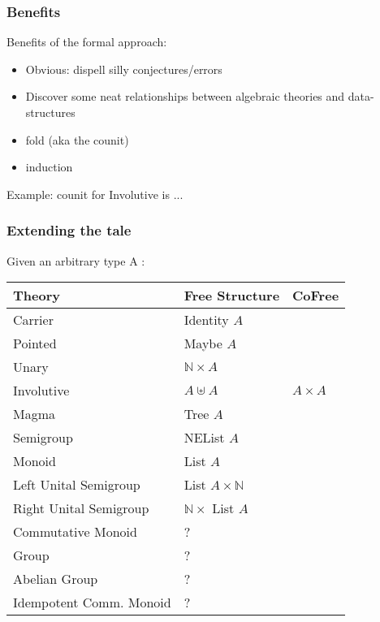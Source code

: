 \documentclass[serif,mathserif,professionalfont,10pt]{beamer}
\newcommand{\sred}[1]{\textcolor{slidered}{#1}}
\begin{document}
\begin{frame}
\frametitle{Benefits}
Benefits of the formal approach:
\begin{itemize}
\item Obvious: dispell silly conjectures/errors
\item Discover some neat relationships between algebraic theories and data-structures
\item fold (aka the counit)
\item induction
\end{itemize} \vspace*{4mm}
\pause
Example: counit for Involutive is ...
\vfill
\end{frame}

\begin{frame}
\frametitle{Extending the tale}
Given an arbitrary type A : \\ \vspace*{4mm}
\begin{tabular}{lll}
\textbf{Theory} & \textbf{Free Structure} & CoFree \\ \hline
Carrier & Identity $A$ & \\
Pointed & Maybe $A$ & \\ \hline
Unary & $ℕ × A$ &  \\
Involutive & $A ⊎ A$ & $A × A$ \\ \hline
Magma & Tree $A$ &  \\
Semigroup & NEList $A$ & \\ \hline
Monoid & List $A$ & \\
Left Unital Semigroup & List $A × ℕ$ & \\
Right Unital Semigroup & $ℕ ×$ List $A$ & \\ \hline
\sred{Commutative Monoid} & \sred{?} & \\
\sred{Group} & \sred{?} & \\
\sred{Abelian Group} & \sred{?} & \\
\sred{Idempotent Comm. Monoid} & \sred{?} & \\
\end{tabular}
\end{frame}
\end{document}
